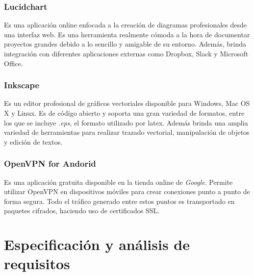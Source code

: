 \documentclass[12pt, twoside]{article}
\begin{document}
        \subsubsection{Lucidchart}
            Es una aplicación online enfocada a la creación de diagramas profesionales desde una interfaz web. Es una herramienta realmente cómoda a la hora de documentar proyectos grandes debido a lo sencillo y amigable de su entorno. Además, brinda integración con diferentes aplicaciones externas como Dropbox, Slack y Microsoft Office. 

        \subsubsection{Inkscape}
            Es un editor profesional de gráficos vectoriales disponible para Windows, Mac OS X y Linux. Es de código abierto y soporta una gran variedad de formatos, entre los que se incluye \textit{.eps}, el formato utilizado por latex. Además brinda una amplia variedad de herramientas para realizar trazado vectorial, manipulación de objetos y edición de textos.

        \subsubsection{OpenVPN for Andorid}
            Es una aplicación gratuita disponible en la tienda online de \textit{Google}. Permite utilizar OpenVPN en dispositivos móviles para crear conexiones punto a punto de forma segura. Todo el tráfico generado entre estos puntos es transportado en paquetes cifrados, haciendo uso de certificados SSL.


\cleardoublepage \section{Especificación y análisis de requisitos} \label{sec:req}
    
\end{document}
